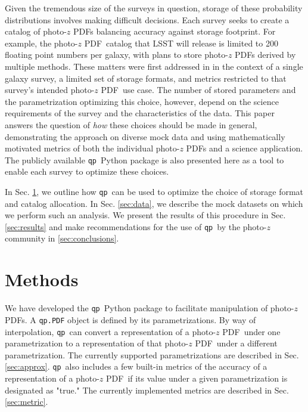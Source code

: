 \documentclass[\docopts]{\docclass}
\newcommand{\qp}{\texttt{qp}}
\newcommand{\pz}{photo-$z$ PDF}
\begin{document}
Given the tremendous size of the surveys in question, storage of these 
probability distributions involves making difficult decisions.  Each survey 
seeks to create a catalog of \pz s balancing accuracy against storage 
footprint.  For example, the \pz\ catalog that LSST will release is limited to 
200 floating point numbers per galaxy, with plans to store \pz s derived by 
multiple methods.  \citep{juric_data_2017}    These matters were first addressed in 
\citet{carrasco_kind_sparse_2014} in the context of a single galaxy survey, a 
limited set of storage formats, and metrics restricted to that survey's 
intended \pz\ use case.  The number of stored parameters and the 
parametrization optimizing this choice, however, depend on the science 
requirements of the survey and the characteristics of the data.  This paper 
answers the question of \textit{how} these choices should be made in general, 
demonstrating the approach on diverse mock data and using mathematically 
motivated metrics of both the individual \pz s and a science application.  The 
publicly available \qp\ Python package is also presented here as a tool to 
enable each survey to optimize these choices.

In Sec. \ref{sec:methods}, we outline how \qp\ can be used to optimize the 
choice of storage format and catalog allocation.  In Sec. \ref{sec:data}, we 
describe the mock datasets on which we perform such an analysis.  We present 
the results of this procedure in Sec. \ref{sec:results} and make 
recommendations for the use of \qp\ by the photo-$z$ community in 
\ref{sec:conclusions}.








\section{Methods}
\label{sec:methods}



We have developed the \qp\ Python package to facilitate manipulation of \pz s.  
A \texttt{qp.PDF} object is defined by its parametrizations.  By way of 
interpolation, \qp\ can convert a representation of a \pz\ under one 
parametrization to a representation of that \pz\ under a different 
parametrization.  The currently supported parametrizations are described in 
Sec. \ref{sec:approx}.  \qp\ also includes a few built-in metrics of the 
accuracy of a representation of a \pz\ if its value under a given 
parametrization is designated as "true."  The currently implemented metrics are 
described in Sec. \ref{sec:metric}.
\end{document}
